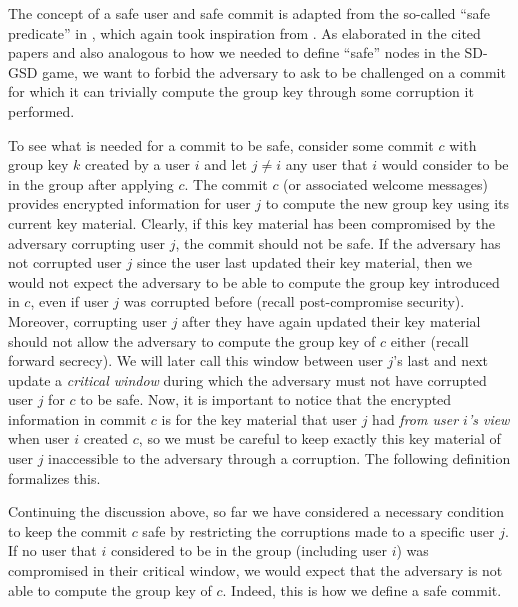 The concept of a safe user and safe commit is adapted from the so-called ``safe predicate'' in \cite{ttkem}, which again took inspiration from \cite{rtreekem}. As elaborated in the cited papers and also analogous to how we needed to define ``safe'' nodes in the SD-GSD game, we want to forbid the adversary to ask to be challenged on a commit for which it can trivially compute the group key through some corruption it performed.

To see what is needed for a commit to be safe, consider some commit $c$ with group key $k$ created by a user $i$ and let $j \neq i$ any user that $i$ would consider to be in the group after applying $c$. The commit $c$ (or associated welcome messages) provides encrypted information for user $j$ to compute the new group key using its current key material. Clearly, if this key material has been compromised by the adversary corrupting user $j$, the commit should not be safe. If the adversary has not corrupted user $j$ since the user last updated their key material, then we would not expect the adversary to be able to compute the group key introduced in $c$, even if user $j$ was corrupted before (recall post-compromise security). Moreover, corrupting user $j$ after they have again updated their key material should not allow the adversary to compute the group key of $c$ either (recall forward secrecy). We will later call this window between user $j$'s last and next update a \emph{critical window} during which the adversary must not have corrupted user $j$ for $c$ to be safe. Now, it is important to notice that the encrypted information in commit $c$ is for the key material that user $j$ had \emph{from user $i$'s view} when user $i$ created $c$, so we must be careful to keep exactly this key material of user $j$ inaccessible to the adversary through a corruption. The following definition formalizes this.

\begin{definition} \label{def:safe-user}
\end{definition}

Continuing the discussion above, so far we have considered a necessary condition to keep the commit $c$ safe by restricting the corruptions made to a specific user $j$. If no user that $i$ considered to be in the group (including user $i$) was compromised in their critical window, we would expect that the adversary is not able to compute the group key of $c$. Indeed, this is how we define a safe commit.

\begin{definition} \label{def:safe-commit}
\end{definition}


